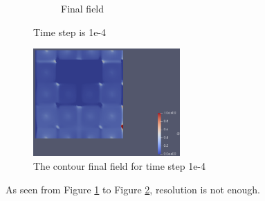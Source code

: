 \documentclass{article}
\begin{document}
\begin{figure}[hbt!]
\begin{subfigure}{0.4\textwidth}
        \caption{Final field}
  \end{subfigure}
  \caption{Time step is 1e-4}
  \label{t1m2_1} 
\end{figure}

\begin{figure}[hbt!]
    \centering
    \includegraphics[width=0.5\textwidth]{Figures/e-4 40x40/contour.png}
    \caption{The contour final field for time step 1e-4}
    \label{t1m2_2} 
\end{figure}

As seen from Figure \ref{t1m2_1} to Figure \ref{t1m2_2}, resolution is not enough. 

\clearpage
\end{document}
